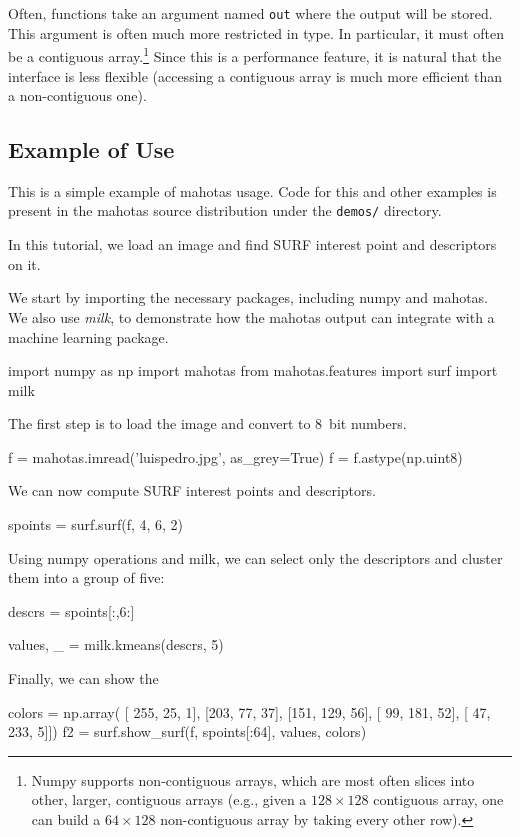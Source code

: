 \documentclass{article}
\let\code\texttt
\begin{document}
Often, functions take an argument named \code{out} where the output will be
stored. This argument is often much more restricted in type. In particular, it
must often be a contiguous array.\footnote{Numpy supports non-contiguous
arrays, which are most often slices into other, larger, contiguous arrays
(e.g., given a $128 \times 128$ contiguous array, one can build a $64 \times
128$ non-contiguous array by taking every other row).} Since this is a
performance feature, it is natural that the interface is less flexible
(accessing a contiguous array is much more efficient than a non-contiguous
one).

\subsection{Example of Use}

This is a simple example of mahotas usage. Code for this and other examples is
present in the mahotas source distribution under the \texttt{demos/} directory.

In this tutorial, we load an image and find SURF interest point and descriptors
on it.

We start by importing the necessary packages, including numpy and mahotas. We
also use \textit{milk}, to demonstrate how the mahotas output can integrate
with a machine learning package.

\begin{python}
import numpy as np
import mahotas
from mahotas.features import surf
import milk
\end{python}

The first step is to load the image and convert to 8~bit numbers.
\begin{python}
f = mahotas.imread('luispedro.jpg', as_grey=True)
f = f.astype(np.uint8)
\end{python}

We can now compute SURF interest points and descriptors.
\begin{python}
spoints = surf.surf(f, 4, 6, 2)
\end{python}

Using numpy operations and milk, we can select only the descriptors and cluster
them into a group of five:

\begin{python}
descrs = spoints[:,6:]

values, _ = milk.kmeans(descrs, 5)
\end{python}

Finally, we can show the 
\begin{python}
colors = np.array(
    [ 255,  25,   1],
    [203,  77,  37],
    [151, 129,  56],
    [ 99, 181,  52],
    [ 47, 233,   5]])
f2 = surf.show_surf(f, spoints[:64], values, colors)
\end{python}
\end{document}
